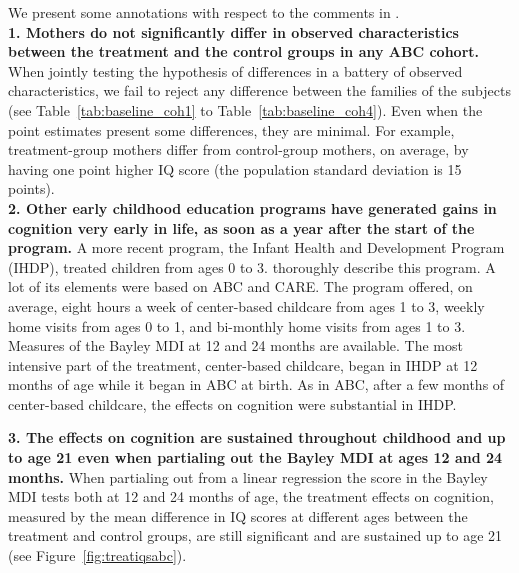 \begin{appendices}
\noindent We present some annotations with respect to the comments in \citet{Spitz_1992_ABC-Retardation}.\\

\noindent \textbf{1. Mothers do not significantly differ in observed characteristics between the treatment and the control groups in any ABC cohort.} When jointly testing the hypothesis of differences in a battery of observed characteristics, we fail to reject any difference between the families of the subjects (see Table~\ref{tab:baseline_coh1} to Table~\ref{tab:baseline_coh4}). Even when the point estimates present some differences, they are minimal. For example, treatment-group mothers differ from control-group mothers, on average, by having one point higher IQ score (the population standard deviation is 15 points).\\

\noindent \textbf{2. Other early childhood education programs have generated gains in cognition very early in life, as soon as a year after the start of the program.} A more recent program, the Infant Health and Development Program (IHDP), treated children from ages 0 to 3. \citet{Gross_Spiker_etal_1997_BOOKHelpinglowbirth} thoroughly describe this program. A lot of its elements were based on ABC and CARE. The program offered, on average, eight hours a week of center-based childcare from ages 1 to 3, weekly home visits from ages 0 to 1, and bi-monthly home visits from ages 1 to 3. Measures of the Bayley MDI at 12 and 24 months are available. The most intensive part of the treatment, center-based childcare, began in IHDP at 12 months of age while it began in ABC at birth. As in ABC, after a few months of center-based childcare, the effects on cognition were substantial in IHDP.



\noindent \textbf{3. The effects on cognition are sustained throughout childhood and up to age 21 even when partialing out the Bayley MDI at ages 12 and 24 months.} When partialing out from a linear regression the score in the Bayley MDI tests both at 12 and 24 months of age, the treatment effects on cognition, measured by the mean difference in IQ scores at different ages between the treatment and control groups, are still significant and are sustained up to age 21 (see Figure~\ref{fig:treatiqsabc}).


\end{appendices}
